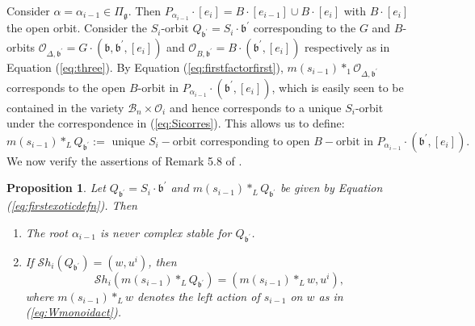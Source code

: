 \documentclass[12pt]{amsart}
\numberwithin{equation}{section}
\newtheorem{prop}[thm]{Proposition}
\newcommand{\fg}{\mbox{${\mathfrak g}$}}
\newcommand{\fb}{\mbox{${\mathfrak b}$}}
\newcommand{\B}{\mathcal{B}}
\newcommand{\Sh}{\mathcal{S}h}
\begin{document}
 Consider $\alpha=\alpha_{i-1}\in\Pi_{\fg}$.  Then $P_{\alpha_{i-1}}\cdot[e_{i}]=B\cdot [e_{i-1}]\cup B\cdot[e_{i}]$ with $B\cdot [e_{i}]$ the open orbit.
Consider the $S_{i}$-orbit $Q_{\fb^{\prime}}=S_{i}\cdot\fb^{\prime}$ corresponding to the $G$ and $B$-orbits $\mathcal{O}_{\Delta,\fb^{\prime}}=G\cdot(\fb,\fb^{\prime}, [e_{i}])$ and $\mathcal{O}_{B,\fb^{\prime}}=B\cdot(\fb^{\prime}, [e_{i}])$ respectively as in Equation (\ref{eq:three}).  By Equation (\ref{eq:firstfactorfirst}),
$m(s_{i-1})*_{1} \mathcal{O}_{\Delta,\fb^{\prime}}$ corresponds to the open  $B$-orbit in  $P_{\alpha_{i-1}}\cdot (\fb^{\prime}, [e_{i}])$,
which is easily seen to be contained in the variety 
$\B_{n}\times\mathcal{O}_{i}$ and hence corresponds to a unique $S_{i}$-orbit under the correspondence in (\ref{eq:Sicorres}).  This allows us to define:
\begin{equation}\label{eq:firstexoticdefn}
m(s_{i-1})*_{L} Q_{\fb^{\prime}}:=\mbox{ unique } S_{i}-\mbox{orbit corresponding to open } B-\mbox{orbit in } P_{\alpha_{i-1}}\cdot(\fb^{\prime}, [e_{i}]). 
\end{equation}
We now verify the assertions of Remark 5.8 of \cite{Siorbits}.
\begin{prop}\label{p:firstweirdmonoid}
Let $Q_{\fb^{\prime}}=S_{i}\cdot \fb^{\prime}$ and $m(s_{i-1})*_{L}Q_{\fb^{\prime}}$ be given by Equation (\ref{eq:firstexoticdefn}).  Then 
\begin{enumerate}
\item The root $\alpha_{i-1}$ is never complex stable for $Q_{\fb^{\prime}}$.
\item  If $\Sh_{i}(Q_{\fb^{\prime}})=(w, u^{i})$, then 
 \begin{equation}\label{eq:firstSh}
 \Sh_{i}(m(s_{i-1})*_{L} Q_{\fb^{\prime}})=(m(s_{i-1})*_{L} w, u^{i}),
 \end{equation}
 where $m(s_{i-1})*_{L}w$ denotes the left action of $s_{i-1}$ on $w$ as in (\ref{eq:Wmonoidact}). 
\end{enumerate}
\end{prop}
\end{document}
